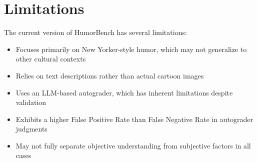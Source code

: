 \documentclass[twocolumn]{article}
\begin{document}
\section*{Limitations}

The current version of HumorBench has several limitations:

\begin{itemize}
    \item Focuses primarily on New Yorker-style humor, which may not generalize to other cultural contexts
    \item Relies on text descriptions rather than actual cartoon images
    \item Uses an LLM-based autograder, which has inherent limitations despite validation
    \item Exhibits a higher False Positive Rate than False Negative Rate in autograder judgments
    \item May not fully separate objective understanding from subjective factors in all cases
\end{itemize}



\end{document}
